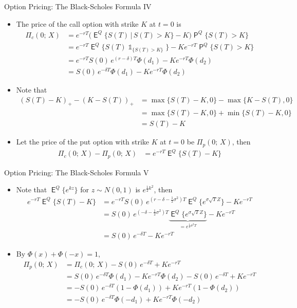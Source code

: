 \documentclass[10pt,handout]{beamer}
\DeclareMathOperator\indc{\mathds{1}}
\DeclareMathOperator\prb{\mathsf{P}}
\DeclareMathOperator\expc{\mathsf{E}}
\theoremstyle{definition}
\begin{document}
\begin{frame}{Option Pricing: The Black-Scholes Formula IV}
  \begin{itemize}
    \item The price of the call option with strike $K$ at $t = 0$ is
      \begin{align*}
        \Pi_c(0;\,X) &= e^{-rT}\big(\expc^Q\{S(T)\,|\, S(T) > K\} - K\big)\prb^Q\{S(T) > K\} \\
        &= e^{-rT}\expc^Q\big\{S(T)\indc_{\{S(T) > K\}}\big\} - Ke^{-rT}\prb^Q\{S(T) > K\} \\
        &= e^{-rT}S(0)\,e^{(r - \delta)T}\Phi(d_1) - Ke^{-rT}\Phi(d_2) \\
        &= S(0)\,e^{-\delta T}\Phi(d_1) - Ke^{-rT}\Phi(d_2)
      \end{align*}
    \item Note that 
      \begin{align*}
        (S(T) - K)_+ - (K - S(T))_+ &= \max\{S(T) - K, 0\} - \max\{K - S(T), 0\} \\
        &= \max\{S(T) - K, 0\} + \min\{S(T) - K, 0\} \\ &= S(T) - K
      \end{align*}
    \item Let the price of the put option with strike $K$ at $t = 0$ be $\Pi_p(0;\,X)$, then
      \begin{align*}
        \Pi_c(0;\,X) - \Pi_p(0;\,X) &= e^{-rT}\expc^Q\{S(T) - K\}
      \end{align*}
  \end{itemize}
\end{frame}

\begin{frame}{Option Pricing: The Black-Scholes Formula V}
  \begin{itemize}
    \item Note that $\expc^Q\{e^{kz}\}$ for $z\sim N(0, 1)$ is $e^{\frac{1}{2}k^2}$, then
      \begin{align*}
        e^{-rT}\expc^Q\{S(T) - K\} &= e^{-rT}S(0)\,e^{(r - \delta - \frac{1}{2}\sigma^2)T}\expc^Q\big\{e^{\sigma\sqrt{T}Z}\big\} - K e^{-rT} \\
        &= S(0)\,e^{(- \delta - \frac{1}{2}\sigma^2)T}\underbrace{\expc^Q\big\{e^{\sigma\sqrt{T}Z}\big\}}_{ = e^{\frac{1}{2}\sigma^2T}}- K e^{-rT} \\
        &= S(0)\,e^{-\delta T} - K e^{-rT}
      \end{align*}
    \item By $\Phi(x) + \Phi(-x) = 1$,
      \begin{align*}
        \Pi_p(0;\,X) &= \Pi_c(0;\,X) - S(0)\,e^{-\delta T} + K e^{-rT} \\
                     &= S(0)\,e^{-\delta T}\Phi(d_1) - Ke^{-rT}\Phi(d_2) - S(0)\,e^{-\delta T} + K e^{-rT} \\ 
                     &= -S(0)\,e^{-\delta T}(1 - \Phi(d_1)) + Ke^{-rT}(1 - \Phi(d_2))\\ 
                     &= -S(0)\,e^{-\delta T}\Phi(-d_1) + Ke^{-rT}\Phi(-d_2) 
      \end{align*}
  \end{itemize}
\end{frame}
\end{document}
